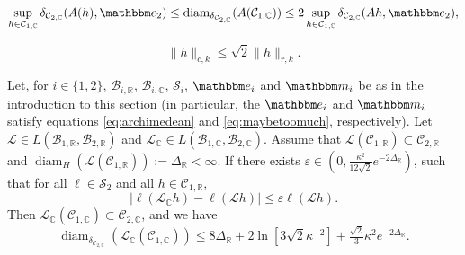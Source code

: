 \documentclass[10pt,a4paper]{amsart}
\newcommand\bC{{\mathbb C}}
\newcommand\bR{{\mathbb R}}
\newcommand\cB{{\mathcal B}}
\newcommand\cC{{\mathcal C}}
\newcommand\cL{{\mathcal L}}
\newcommand\cS{{\mathcal S}}
\newcommand\ve{\varepsilon}
\newcommand{\bbe}{\mathbbm e}
\newcommand{\bbm}{\mathbbm m}
\newcommand{\diam}{\operatorname{diam}}
\begin{document}
\begin{equation}
\label{eq:rad double}
\sup_{h\in\cC_{1, \bC}}\delta_{\cC_{2, \bC}}(A (h),\bbe_2)\leq \diam_{\delta_{\cC_{2,\bC}}}(A(\cC_{1,\bC}))\leq 2\sup_{h\in\cC_{1,\bC}}\delta_{\cC_{2, \bC}}(A h,\bbe_2),
\end{equation}

\begin{equation}\label{eq:norms_equiv}
\|h\|_{c,k}\leq \sqrt 2\|h\|_{r,k}.
\end{equation}

\begin{thm} \label{thm:needed} 
Let, for $i\in\{1,2\}$, $\cB_{i,\bR}$, $\cB_{i,\bC}$, $\cS_i$, $\bbe_i$ and $\bbm_i$ be as in the introduction to this section (in particular, the $\bbe_i$ and $\bbm_i$ satisfy equations \eqref{eq:archimedean} and \eqref{eq:maybetoomuch}, respectively).
Let $\cL\in L(\cB_{1,\bR},\cB_{2,\bR})$ and $\cL_\bC\in L(\cB_{1,\bC},\cB_{2,\bC})$.
Assume that $\cL(\cC_{1,\bR})\subset \cC_{2,\bR}$ and $\diam_H(\cL(\cC_{1,\bR})):=\Delta_\bR<\infty$. 
If there exists $\ve \in (0, \frac{\kappa^2}{12 \sqrt 2}e^{-2\Delta_\bR})$, such that
for all $\ell \in \cS_2$ and all $h \in \cC_{1,\bR}$,
\begin{equation}\label{eq:complex_bound}
\left|\ell(\cL_{\bC} h)-\ell(\cL h)\right|\leq \ve \ell(\cL h).
\end{equation}
Then $\cL_{\bC}(\cC_{1,\bC})\subset \cC_{2,\bC}$, and we have
\[
\diam_{\delta_{\cC_{2, \bC}}} (\cL_{\bC}(\cC_{1,\bC}))\leq 8\Delta_\bR +
 2 \ln[3\sqrt 2\kappa^{-2}]+ \tfrac{\sqrt{2}}{3} \kappa^2e^{-2\Delta_\bR} . 
\]
\end{thm}
\end{document}
